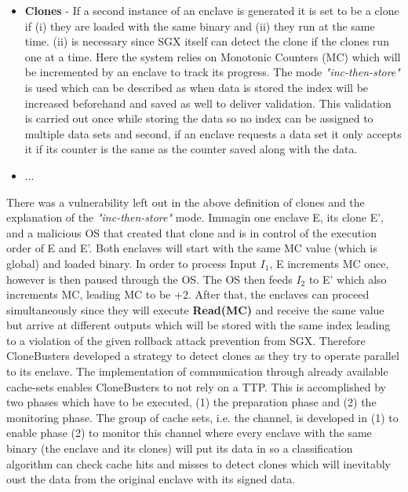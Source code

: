 \begin{itemize}
    \item \textbf{Clones} - If a second instance of an enclave is generated it is set to be a clone if (i) they are loaded with the same binary and (ii) they run at the same time. (ii) is necessary since SGX itself can detect the clone if the clones run one at a time. Here the system relies on Monotonic Counters (MC) which will be incremented by an enclave to track its progress. The mode \textit{"inc-then-store"} is used which can be described as when data is stored the index will be increased beforehand and saved as well to deliver validation. This validation is carried out once while storing the data so no index can be assigned to multiple data sets and second, if an enclave requests a data set it only accepts it if its counter is the same as the counter saved along with the data.
    \item ...
\end{itemize} 

There was a vulnerability left out in the above definition of clones and the explanation of the \textit{"inc-then-store"} mode. Immagin one enclave E, its clone E', and a malicious OS that created that clone and is in control of the execution order of E and E'. Both enclaves will start with the same MC value (which is global) and loaded binary. In order to process Input \(I_1\), E increments MC once, however is then paused through the OS. The OS then feeds \(I_2\) to E' which also increments MC, leading MC to be +2. After that, the enclaves can proceed simultaneously since they will execute \textbf{Read(MC)} and receive the same value but arrive at different outputs which will be stored with the same index leading to a violation of the given rollback attack prevention from SGX. Therefore CloneBusters developed a strategy to detect clones as they try to operate parallel to its enclave. The implementation of communication through already available cache-sets enables CloneBusters to not rely on a TTP. This is accomplished by two phases which have to be executed, (1) the preparation phase and (2) the monitoring phase. The group of cache sets, i.e. the channel, is developed in (1) to enable phase (2) to monitor this channel where every enclave with the same binary (the enclave and its clones) will put its data in so a classification algorithm can check cache hits and misses to detect clones which will inevitably oust the data from the original enclave with its signed data.

